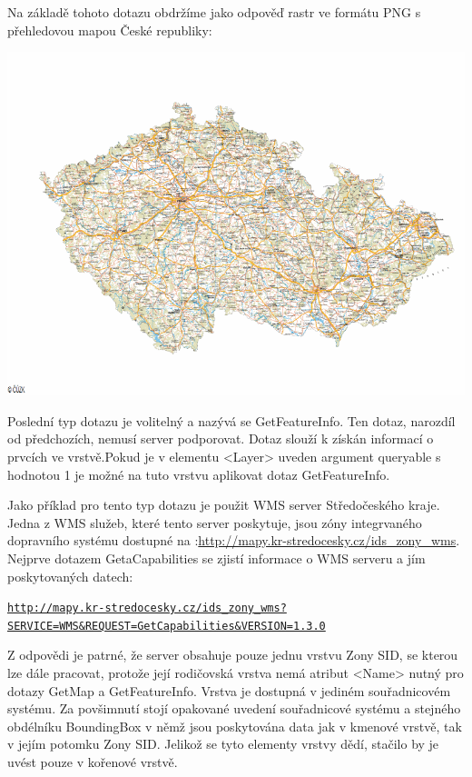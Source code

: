 \documentclass[a4paper,12pt]{article}
\begin{document}
Na základě tohoto dotazu obdržíme jako odpověď rastr ve formátu PNG s přehledovou mapou České republiky:

 \includegraphics[scale=0.5]{GetMapResponse.png}


Poslední typ dotazu je volitelný a nazývá se GetFeatureInfo. Ten dotaz, narozdíl od předchozích, nemusí server podporovat.
Dotaz slouží k získán informací o prvcích ve vrstvě.Pokud je v elementu <Layer> uveden argument  queryable 
s hodnotou 1 je možné na tuto vrstvu aplikovat dotaz GetFeatureInfo.  

Jako příklad pro tento typ dotazu je použit WMS server Středočeského kraje. Jedna z WMS služeb, které tento server poskytuje, jsou zóny integrvaného dopravního systému dostupné
na :\url{http://mapy.kr-stredocesky.cz/ids_zony_wms}. 
Nejprve dotazem GetaCapabilities se zjistí informace o WMS serveru a jím poskytovaných datech:

\newcommand{\StredoceskygetCap}{http://mapy.kr-stredocesky.cz/ids_zony_wms?SERVICE=WMS&REQUEST=GetCapabilities}
\begin{alltt}\footnotesize
\href{\StredoceskygetCap}{http://mapy.kr-stredocesky.cz/ids\_zony\_wms?}
\href{\StredoceskygetCap}{SERVICE=WMS\&REQUEST=GetCapabilities\&VERSION=1.3.0}
\end{alltt}

Z odpovědi je patrné, že server obsahuje pouze jednu vrstvu Zony SID, se kterou lze dále pracovat, protože její rodičovská vrstva nemá atribut <Name> nutný pro dotazy GetMap a GetFeatureInfo.
Vrstva je dostupná v jediném souřadnicovém systému. Za povšimnutí stojí opakované uvedení souřadnicové systému a stejného obdélníku BoundingBox v němž jsou poskytována data 
jak v kmenové vrstvě, tak v jejím potomku Zony SID. Jelikož se tyto elementy vrstvy dědí, stačilo by je uvést pouze v kořenové vrstvě.
\end{document}
